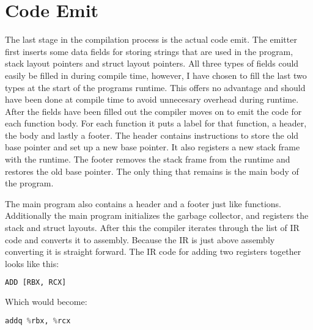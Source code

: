 \section{Code Emit}

The last stage in the compilation process is the actual code emit. The emitter first inserts some data fields for storing strings that are used in the program, stack layout pointers and struct layout pointers. All three types of fields could easily be filled in during compile time, however, I have chosen to fill the last two types at the start of the programs runtime. This offers no advantage and should have been done at compile time to avoid unnecesary overhead during runtime. After the fields have been filled out the compiler moves on to emit the code for each function body. For each function it puts a label for that function, a header, the body and lastly a footer. The header contains instructions to store the old base pointer and set up a new base pointer. It also registers a new stack frame with the runtime. The footer removes the stack frame from the runtime and restores the old base pointer. The only thing that remains is the main body of the program. 

The main program also contains a header and a footer just like functions. Additionally the main program initializes the garbage collector, and registers the stack and struct layouts. After this the compiler iterates through the list of IR code and converts it to assembly. Because the IR is just above assembly converting it is straight forward. The IR code for adding two registers together looks like this:
\begin{lstlisting}[language=Python]
ADD [RBX, RCX]
\end{lstlisting}
Which would become:
\begin{lstlisting}[language=Python]
addq %rbx, %rcx
\end{lstlisting}